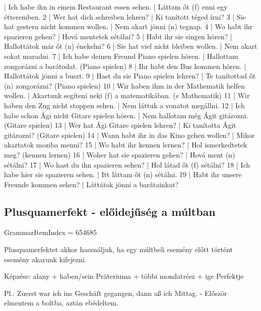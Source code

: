 \documentclass{article}
\newenvironment{desc}{\verbatim}{\endverbatim}
\newenvironment{exmp}{\verbatim}{\endverbatim}
\begin{document}
\begin{exmp}
1 | Ich habe ihn in einem Restaurant essen sehen. | Láttam őt (f) enni egy étteremben.
2 | Wer hat dich schreiben lehren? | Ki tanított téged írni?
3 | Sie hat gestern nicht kommen wollen. | Nem akart jönni (n) tegnap.
4 | Wo habt ihr spazieren gehen? | Hová mentetek sétálni? 
5 | Habt ihr sie singen hören? | Hallottátok már őt (n) énekelni?
6 | Sie hat viel nicht bleiben wollen. | Nem akart sokat maradni.
7 | Ich habe deinen Freund Piano spielen hören. | Hallottam zongorázni a barátodat. (Piano spielen)
8 | Ihr habt den Bus kommen hören. | Hallottátok jönni a buszt.
9 | Hast du sie Piano spielen lehren? | Te tanítottad őt (n) zongorázni? (Piano spielen)
10 | Wir haben ihm in der Mathematik helfen wollen. | Akartunk segíteni neki (f) a matematikában. (e Mathematik)
11 | Wir haben den Zug nicht stoppen sehen. | Nem láttuk a vonatot megállni.
12 | Ich habe schon Ági nicht Gitare spielen hören. | Nem hallotam még Ágit gitározni. (Gitare spielen)
13 | Wer hat Ági Gitare spielen lehren? | Ki tanította Ágit gitározni? (Gitare spielen)
14 | Wann habt ihr in das Kino gehen wollen? | Mikor akartatok moziba menni?
15 | Wo habt ihr kennen lernen? | Hol ismerkedtetek meg? (kennen lernen)
16 | Woher hat sie spazieren gehen? | Hová ment (n) sétálni?
17 | Wo hast du ihn spazieren sehen? | Hol látad őt (f) sétálni?
18 | Ich habe hier sie spazieren sehen. | Itt láttam őt (n) sétálni.
19 | Habt ihr unsere Freunde kommen sehen? | Láttátok jönni a barátainkat?
\end{exmp}

\subsection{Plusquamerfekt - előidejűség a múltban}

GrammarItemIndex = 654685

\begin{desc}
Plusquamerfektet akkor használjuk, ha egy múltbeli esemény előtt történt esemény akarunk kifejezni.

Képzése:
alany + haben/sein Präteriuma + többi mondatrész + ige Perfektje

Pl.: Zuerst war ich ins Geschäft gegangen, dann aß ich Mittag. - Először elmentem a boltba, aztán ebédeltem.
\end{desc}
\end{document}
